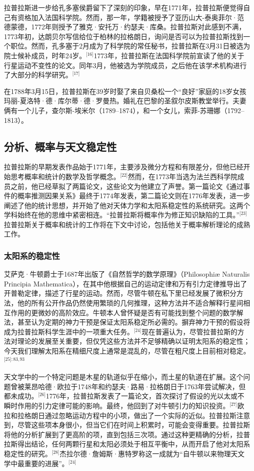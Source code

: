 拉普拉斯进一步给孔多塞侯爵留下了深刻的印象，早在1771年，拉普拉斯便觉得自己有资格加入法国科学院。然而，那一年，学籍被授予了亚历山大-泰奥菲尔·范德蒙德，1772年则授予了雅克·安托万·约瑟夫·库桑。拉普拉斯对此感到不满，1773年初，达朗贝尔写信给位于柏林的拉格朗日，询问是否可以为拉普拉斯找到一个职位。然而，孔多塞于2月成为了科学院的常任秘书，拉普拉斯在3月31日被选为院士候补成员，时年24岁。\(^\text{[16]}\)1773年，拉普拉斯在法国科学院前宣读了他的关于行星运动不变性的论文。同年3月，他被选为学院成员，之后他在该学术机构进行了大部分的科学研究。\(^\text{[17]}\)

在1788年3月15日，拉普拉斯在39岁时娶了来自贝桑松一个“良好”家庭的18岁女孩玛丽-夏洛特·德·库尔蒂·德·罗曼热。婚礼在巴黎的圣叙尔皮斯教堂举行。夫妻俩有一个儿子，查尔斯-埃米尔（1789–1874），和一个女儿，索菲-苏珊娜（1792–1813）。
\subsection{分析、概率与天文稳定性}
拉普拉斯的早期发表作品始于1771年，主要涉及微分方程和有限差分，但他已经开始思考概率和统计的数学及哲学概念。\(^\text{[22]}\)然而，在1773年当选为法兰西科学院成员之前，他已经草拟了两篇论文，这些论文为他建立了声誉。第一篇论文《通过事件的概率推测因果关系》最终于1774年发表，第二篇论文则在1776年发表，进一步阐述了他的统计思想，并开始了他对天体力学和太阳系稳定性的系统研究。这两个学科始终在他的思维中紧密相连。“拉普拉斯将概率作为修正知识缺陷的工具。”\(^\text{[23]}\)拉普拉斯关于概率和统计的工作将在下文中讨论，包括他关于概率解析理论的成熟工作。
\subsubsection{太阳系的稳定性}  
艾萨克·牛顿爵士于1687年出版了《自然哲学的数学原理》（Philosophiæ Naturalis Principia Mathematica），在其中他根据自己的运动定律和万有引力定律推导出了开普勒定律，描述了行星的运动。然而，尽管牛顿在私下里已经发展了微积分方法，他的所有公开作品仍然使用繁琐的几何推理，这种方法并不适合解释行星间相互作用的更微妙的高阶效应。牛顿本人曾怀疑是否有可能找到整个问题的数学解法，甚至认为定期的神力干预是保证太阳系稳定所必需的。摒弃神力干预的假设将成为拉普拉斯科学生涯中的一项重大任务。\(^\text{[24]}\)现在普遍认为，尽管拉普拉斯的方法对理论的发展至关重要，但仅凭这些方法并不足够精确以证明太阳系的稳定性；今天我们理解太阳系在精细尺度上通常是混乱的，尽管在粗尺度上目前相对稳定。\(^\text{[25]: 83, 93}\)

天文学中的一个特定问题是木星的轨道似乎在缩小，而土星的轨道在扩展。这个问题曾被莱昂哈德·欧拉于1748年和约瑟夫·路易·拉格朗日于1763年尝试解决，但都未成功。\(^\text{[26]}\)1776年，拉普拉斯发表了一篇论文，首次探讨了假设的光以太或不瞬时作用的引力定律可能的影响。最终，他回到了对牛顿引力的知识投资。\(^\text{[27]}\)欧拉和拉格朗日通过忽略运动方程中的小项，做出了一个实际的近似。拉普拉斯注意到，尽管这些项本身很小，但当它们在时间上积累时，可能会变得重要。拉普拉斯将他的分析扩展到了更高阶的项，直到包括三次项。通过这种更精确的分析，拉普拉斯得出结论，任何两颗行星和太阳必须处于相互平衡中，从而开启了他对太阳系稳定性的研究。\(^\text{[28]}\)杰拉尔德·詹姆斯·惠特罗称这一成就为“自牛顿以来物理天文学中最重要的进展”。\(^\text{[24]}\)

